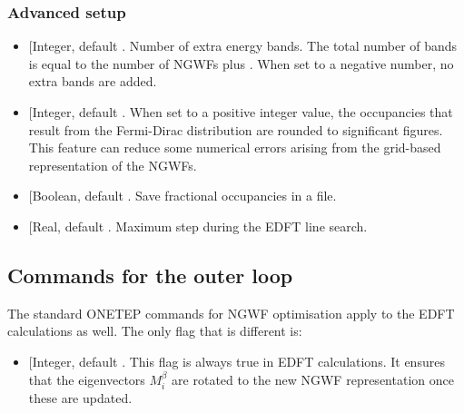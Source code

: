 \documentclass[letterpaper,10pt,english]{sphinxmanual}
\begin{document}
\subsubsection{Advanced setup}
\label{\detokenize{onetep_edft_documentation:advanced-setup}}\begin{itemize}
\item {} 
 {[}Integer, default
\sphinxcode{edft\_extra\_bands: -1}{]}. Number of extra energy bands. The total
number of bands is equal to the number of NGWFs plus
. When set to a negative number, no extra bands
are added.

\item {} 
 {[}Integer, default
\sphinxcode{edft\_round\_evals: -1}{]}. When set to a positive integer value, the
occupancies that result from the Fermi-Dirac distribution are rounded
to  significant figures. This feature can reduce some numerical
errors arising from the grid-based representation of the NGWFs.

\item {} 
 {[}Boolean, default \sphinxcode{edft\_write\_occ: F}{]}. Save
fractional occupancies in a file.

\item {} 
 {[}Real, default \sphinxcode{edft\_max\_step: 1.0}{]}. Maximum
step during the EDFT line search.

\end{itemize}


\subsection{Commands for the outer loop}
\label{\detokenize{onetep_edft_documentation:commands-for-the-outer-loop}}
The standard ONETEP commands for NGWF optimisation apply to the EDFT
calculations as well. The only flag that is different is:
\begin{itemize}
\item {} 
 {[}Integer, default \sphinxcode{ngwf\_cg\_rotate: T}{]}.
This flag is always true in EDFT calculations. It ensures that the
eigenvectors \({M^\beta_i}\) are rotated to the new
NGWF representation once these are updated.

\end{itemize}
\end{document}
